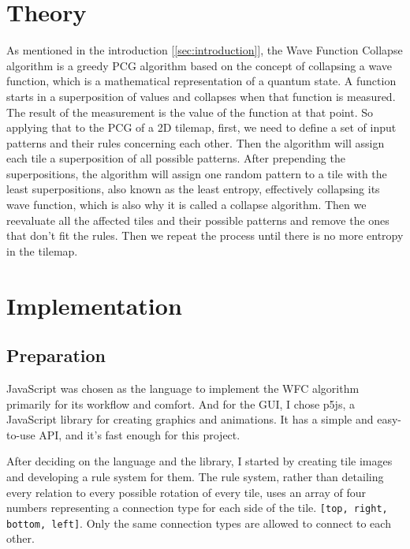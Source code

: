 \documentclass[10pt,oneside,a4paper]{article}
\begin{document}
\section{Theory}\label{sec:theory}
As mentioned in the introduction [\ref*{sec:introduction}], the Wave Function Collapse algorithm is a greedy PCG algorithm based on the concept of collapsing a wave function, which is a mathematical representation of a quantum state.
A function starts in a superposition of values and collapses when that function is measured.
The result of the measurement is the value of the function at that point.
So applying that to the PCG of a 2D tilemap, first, we need to define a set of input patterns and their rules concerning each other.
Then the algorithm will assign each tile a superposition of all possible patterns.
After prepending the superpositions, the algorithm will assign one random pattern to a tile with the least superpositions, also known as the least entropy, effectively collapsing its wave function, which is also why it is called a collapse algorithm.
Then we reevaluate all the affected tiles and their possible patterns and remove the ones that don't fit the rules.
Then we repeat the process until there is no more entropy in the tilemap.

\section{Implementation}\label{sec:implementation}
\subsection{Preparation}\label{sec:preparation}
JavaScript was chosen as the language to implement the WFC algorithm primarily for its workflow and comfort.
And for the GUI, I chose p5js, a JavaScript library for creating graphics and animations.
It has a simple and easy-to-use API, and it's fast enough for this project.

After deciding on the language and the library, I started by creating tile images and developing a rule system for them.
The rule system, rather than detailing every relation to every possible rotation of every tile, uses an array of four numbers representing a connection type for each side of the tile. \texttt{[top, right, bottom, left]}.
Only the same connection types are allowed to connect to each other.
\end{document}
